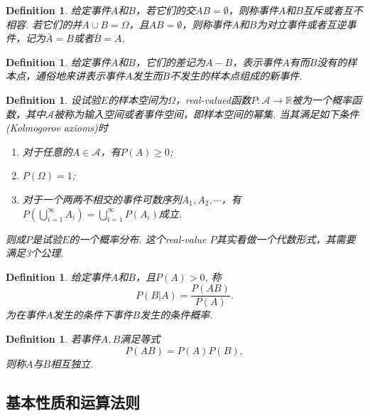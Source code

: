 \documentclass{article}
\newtheorem{definition}[theorem]{Definition}
\newcommand*{\xfunc}[4]{{#2}\colon{#3}{#1}{#4}}
\newcommand*{\func}[3]{\xfunc{\to}{#1}{#2}{#3}}
\begin{document}
\begin{definition}
\rm 给定事件$A$和$B$，若它们的交$AB = \emptyset$，则称事件$A$和$B${\color{red}互斥}或者{\color{red}互不相容}. 若它们的并$A\cup B = \Omega$，且$AB=\emptyset$，则称事件$A$和$B$为{\color{red}对立事件}或者{\color{red}互逆事件}，记为$\bar{A} = B$或者$\bar{B} = A$.
\end{definition}

\begin{definition}
\rm 给定事件$A$和$B$，它们的差记为$A-B$，表示事件$A$有而$B$没有的样本点，通俗地来讲表示事件$A$发生而$B$不发生的样本点组成的新事件.
\end{definition}

\begin{definition}
\rm 设试验$E$的样本空间为$\Omega$，real-valued函数$\func{P}{\mathcal{A}}{\mathbb{R}}$被为一个概率函数，其中$\mathcal{A}$被称为{\color{red}输入空间}或者{\color{red}事件空间}，即样本空间的{\color{red}幂集}. 当其满足如下条件(Kolmogorov axioms)时
\begin{enumerate}
	\item 对于任意的$A \in \mathcal{A}$，有$P(A) \geq 0$;
	\item $P(\Omega) = 1$;
	\item 对于一个两两不相交的事件可数序列$A_1,A_2,\cdots$，有$P(\bigcup\limits_{i=1}^{\infty} A_i) = \bigcup\limits_{i=1}^{\infty}P(A_i)$成立.
\end{enumerate}
则成$P$是试验$E$的一个{\color{red}概率分布}. {\color{blue} 这个real-value $P$其实看做一个代数形式，其需要满足3个公理.}
\end{definition}

\begin{definition}
\rm 给定事件$A$和$B$，且$P(A) > 0$, 称
$$
P(B|A) = \frac{P(AB)}{P(A)}.
$$
为在事件$A$发生的条件下事件$B$发生的{\color{red}条件概率}.
\end{definition}

\begin{definition}
\rm 若事件$A,B$满足等式
$$
P(AB) = P(A)P(B),
$$
则称$A$与$B${\color{red}相互独立}.
\end{definition}

\newpage
\subsection{基本性质和运算法则}
\end{document}

